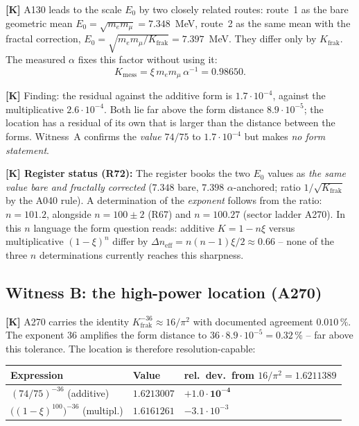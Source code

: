 \textbf{[K]} A130 leads to the scale $E_0$ by two closely related routes:
route~1 as the bare geometric mean $E_0 = \sqrt{m_e m_\mu} = 7.348$~MeV,
route~2 as the same mean with the fractal correction,
$E_0 = \sqrt{m_e m_\mu/K_\text{frak}} = 7.397$~MeV. They differ only by
$K_\text{frak}$. The measured $\alpha$ fixes this factor without using it:
\[
  K_\text{mess} = \xi\,m_e m_\mu\,\alpha^{-1} = 0.98650 .
\]

\textbf{[K]} Finding: the residual against the additive form is
$1.7\cdot10^{-4}$, against the multiplicative $2.6\cdot10^{-4}$. Both lie
far above the form distance $8.9\cdot10^{-5}$; the location has a residual
of its own that is larger than the distance between the forms. Witness~A
confirms the \emph{value} $74/75$ to $1.7\cdot10^{-4}$ but makes \emph{no
form statement}.

\textbf{[K] Register status (R72):} The
register books the two $E_0$ values as \emph{the same value bare and
fractally corrected} ($7.348$ bare, $7.398$ $\alpha$-anchored; ratio
$1/\sqrt{K_\text{frak}}$ by the A040 rule). A determination of the
\emph{exponent} follows from the ratio: $n = 101.2$, alongside
$n = 100\pm2$ (R67) and $n = 100.27$ (sector ladder A270). In this
$n$ language the form question reads: additive $K = 1-n\xi$ versus
multiplicative $(1-\xi)^{n}$ differ by
$\Delta n_\text{eff} = n(n-1)\xi/2 \approx 0.66$ -- none of the three
$n$ determinations currently reaches this sharpness.

\subsection{Witness B: the high-power location (A270)}

\textbf{[K]} A270 carries the identity
$K_\text{frak}^{-36} \approx 16/\pi^2$ with documented agreement
$0.010\,\%$. The exponent $36$ amplifies the form distance to
$36\cdot8.9\cdot10^{-5} = 0.32\,\%$ -- far above this tolerance. The
location is therefore resolution-capable:

\begin{center}
\begin{tabular}{lll}
\toprule
Expression & Value & rel.\ dev.\ from $16/\pi^2 = 1.6211389$ \\
\midrule
$(74/75)^{-36}$ (additive) & $1.6213007$ & $\mathbf{+1.0\cdot10^{-4}}$ \\
$\bigl((1-\xi)^{100}\bigr)^{-36}$ (multipl.) & $1.6161261$ & $-3.1\cdot10^{-3}$ \\
\bottomrule
\end{tabular}
\end{center}

